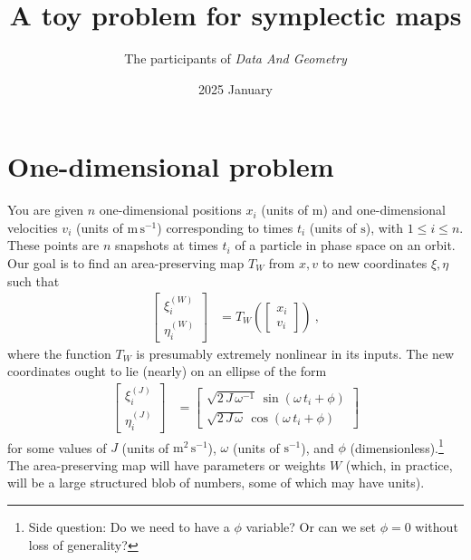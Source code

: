 \documentclass{article}
\title{\bfseries%
A toy problem for symplectic maps}
\author{The participants of \textsl{Data And Geometry}}
\date{2025 January}
\newcommand{\unit}[1]{\mathrm{#1}}
\newcommand{\m}{\unit{m}}
\newcommand{\s}{\unit{s}}
\newcommand{\ps}{\s^{-1}}
\newcommand{\mps}{\m\,\ps}
\newcommand{\mmps}{\m^2\,\ps}
\begin{document}
\maketitle

\section{One-dimensional problem}
You are given $n$ one-dimensional positions $x_i$ (units of $\m$) and one-dimensional velocities $v_i$ (units of $\mps$) corresponding to times $t_i$ (units of $\s$), with $1\leq i\leq n$.
These points are $n$ snapshots at times $t_i$ of a particle in phase space on an orbit.
Our goal is to find an area-preserving map $T_W$ from $x, v$ to new coordinates $\xi, \eta$ such that
\begin{align}
    \begin{bmatrix}\xi^{(W)}_i \\ \eta^{(W)}_i\end{bmatrix} &= T_W\left(\begin{bmatrix}x_i \\ v_i\end{bmatrix}\right) ~,
\end{align}
where the function $T_W$ is presumably extremely nonlinear in its inputs.
The new coordinates ought to lie (nearly) on an ellipse of the form
\begin{align}
    \begin{bmatrix}\xi^{(J)}_i \\ \eta^{(J)}_i\end{bmatrix} &= \begin{bmatrix}\sqrt{2\,J\,\omega^{-1}}\,\sin(\omega\,t_i+\phi) \\ \sqrt{2\,J\,\omega}\,\cos(\omega\,t_i+\phi)\end{bmatrix}
\end{align}
for some values of $J$ (units of $\mmps$), $\omega$ (units of $\ps$), and $\phi$ (dimensionless).\footnote{Side question: Do we need to have a $\phi$ variable? Or can we set $\phi=0$ without loss of generality?}
The area-preserving map will have parameters or weights $W$ (which, in practice, will be a large structured blob of numbers, some of which may have units).
\end{document}
